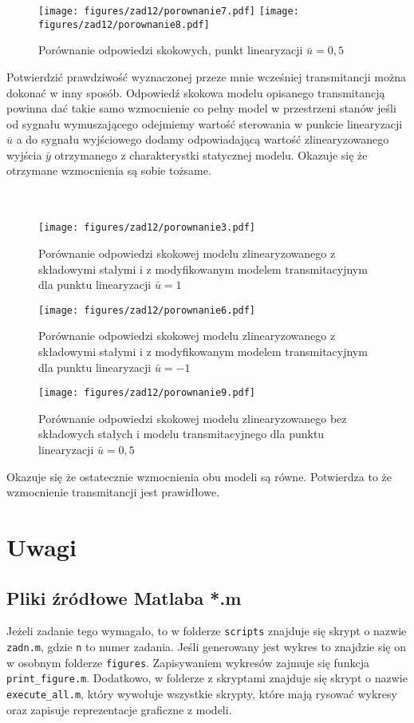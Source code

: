 \documentclass[a4paper,titlepage,11pt,floatssmall]{mwrep}
\begin{document}
\begin{figure}[H]
\centering
\texttt{[image: figures/zad12/porownanie7.pdf]}
\quad
\texttt{[image: figures/zad12/porownanie8.pdf]}
\caption{Porównanie odpowiedzi skokowych, punkt linearyzacji $\bar{u} = 0,5$} 
\end{figure}
\newpage

Potwierdzić prawdziwość wyznaczonej przeze mnie wcześniej transmitancji można dokonać w inny sposób. Odpowiedź skokowa modelu opisanego transmitancją powinna dać takie samo wzmocnienie co pełny model w przestrzeni stanów jeśli od sygnału wymuszającego odejmiemy wartość sterowania w punkcie linearyzacji $\bar{u}$ a do sygnału wyjściowego dodamy odpowiadającą wartość zlinearyzowanego wyjścia $\bar{y}$ otrzymanego z charakterystki statycznej modelu. Okazuje się że otrzymane wzmocnienia są sobie tożsame.  \\ \\ \bigskip \\ \bigskip
\begin{figure}[H]
\centering
\texttt{[image: figures/zad12/porownanie3.pdf]}
\caption{Porównanie odpowiedzi skokowej modelu zlinearyzowanego z składowymi stałymi i z modyfikowanym modelem transmitacyjnym dla punktu linearyzacji $\bar{u} = 1$}
\end{figure}
\newpage
\begin{figure}[H]
\centering
\texttt{[image: figures/zad12/porownanie6.pdf]}
\caption{Porównanie odpowiedzi skokowej modelu zlinearyzowanego z składowymi stałymi i z modyfikowanym modelem transmitacyjnym dla punktu linearyzacji $\bar{u} = -1$}
\end{figure}

\begin{figure}[H]
\centering
\texttt{[image: figures/zad12/porownanie9.pdf]}
\caption{Porównanie odpowiedzi skokowej modelu zlinearyzowanego bez składowych stałych i modelu transmitacyjnego dla punktu linearyzacji $\bar{u} = 0,5$}
\end{figure}

Okazuje się że ostatecznie wzmocnienia obu modeli są równe. Potwierdza to że wzmocnienie transmitancji jest prawidłowe.

\chapter{Uwagi}
\section{Pliki źródłowe Matlaba *.m}
\indent{} Jeżeli zadanie tego wymagało, to w folderze \texttt{scripts} znajduje się skrypt o nazwie \texttt{zadn.m}, gdzie \texttt{n} to numer zadania. Jeśli generowany jest wykres to znajdzie się on w osobnym folderze \texttt{figures}. Zapisywaniem wykresów zajmuje się funkcja \texttt{print\_figure.m}. Dodatkowo, w folderze z skryptami znajduje się skrypt o nazwie \texttt{execute\_all.m}, który wywołuje wszystkie skrypty, które mają rysować wykresy oraz zapisuje reprezentacje graficzne z modeli. 
\end{document}
